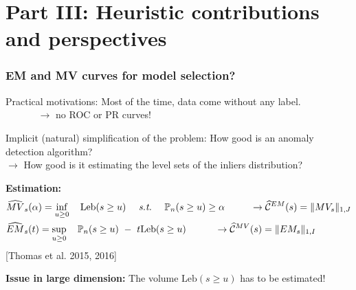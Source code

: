 \documentclass[9pt]{beamer}
\newcommand{\st}{\text{\emph{s.t.}}{}}
\newcommand{\crit}{\mathcal{C}}
\def\leb{\text{Leb}}
\begin{document}
\section{Part III: Heuristic contributions and perspectives}


\begin{frame}
\frametitle{EM and MV curves for model selection?}





\begin{block}{Practical motivations:}
Most of the time, data come without any label.\\
{\footnotesize ~~~~~~ $\to$ no ROC or PR curves!}
\end{block}

\begin{block}{Implicit (natural) simplification of the problem:}
How good is an anomaly detection algorithm?\\
$\to$ How good is it estimating the level sets of the inliers distribution?
\end{block}


\textbf{Estimation:}
\small{
\begin{align*}
&\widehat{MV}_s(\alpha) = \inf_{u \ge 0} ~~~\leb(s \ge u) ~~~~\st~~~~ \mathbb{P}_n(s \ge u) \ge \alpha ~~~~~~~~\to \widehat{\crit}^{EM}(s) = \|MV_s\|_{1, J}\\
&\widehat{EM}_s(t) = \sup_{u \ge 0} ~~~\mathbb{P}_n(s \ge u) ~-~ t \leb(s \ge u) ~~~~~~~~~\to \widehat{\crit}^{MV}(s) = \|EM_s\|_{1, I}
\end{align*}
}
[Thomas et al. 2015, 2016]


\textbf{Issue in large dimension:}
\small{
The volume $\leb(s \ge u)$ has to be estimated! %
}

\end{frame}
\end{document}
